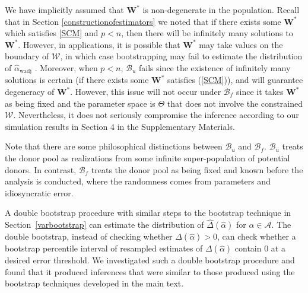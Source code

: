 \documentclass[11pt]{article}
\def\mbf#1{\mathbf{#1}} %
\def\mrm#1{\mathrm{#1}} %
\def\mc#1{\mathcal{#1}} %
\theoremstyle{definition}
\begin{document}
We have implicitly assumed that $\mathbf{W}^*$ is non-degenerate in the population.  Recall that in Section \ref{constructionofestimators} we noted that if there exists some $\mathbf{W}^*$ which satisfies \eqref{SCM} and $p < n$, then there will be infinitely many solutions to $\mathbf{W}^*$. However, in applications, it is possible that $\mathbf{W}^*$ may take values on the boundary of $\mc{W}$, in which case bootstrapping may fail to estimate the distribution of $\hat{\alpha}_{\mrm{wadj}}$ \citep{andrews2000inconsistency}.  Moreover, when $p < n$, $\mc{B}_u$ fails since the existence of infinitely many solutions is certain (if there exists some $\mathbf{W}^*$ satisfies (\ref{SCM})), and will guarantee degeneracy of  $\mathbf{W}^*$. However, this issue will not occur under $\mc{B}_f$ since it takes $\mbf{W}^*$ as being fixed and the parameter space is $\Theta$ that does not involve the constrained $\mc{W}$. Nevertheless, it does not seriously compromise the inference according to our simulation results in Section 4 in the Supplementary Materials. 

Note that there are some philosophical distinctions between $\mc{B}_u$  and $\mc{B}_f$. $\mc{B}_u$ treats the donor pool as realizations from some infinite super-population of potential donors. In contrast, $\mc{B}_f$ treats the donor pool as being fixed  and known before the analysis is conducted, where the randomness comes from parameters and idiosyncratic error.


A double bootstrap procedure with similar steps to the bootstrap technique in Section~\ref{varbootstrap} can estimate the distribution of $\hat\Delta(\hat{\alpha})$ for $\hat{\alpha} \in \mc{A}$. The double bootstrap, instead of checking whether $\Delta(\hat{\alpha})>0$, can check whether a bootstrap percentile interval of resampled estimates of $\Delta(\hat{\alpha})$ contain 0 at a desired error threshold. We investigated such a double bootstrap procedure and found that it produced inferences that were similar to those produced using the bootstrap techniques developed in the main text. 
\end{document}
